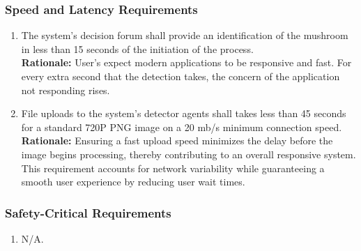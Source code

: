 \documentclass[]{article}
\begin{document}
\subsubsection{Speed and Latency Requirements}
\label{ssub:speed_and_latency_requirements}
\begin{enumerate}[{PR-SL}1. ]
	\item The system's decision forum shall provide an identification of the mushroom in less than 15 seconds of the initiation of the process.\\
	\textbf{Rationale:} User's expect modern applications to be responsive and fast. For every extra second that the detection takes, the concern of the application 
	not responding rises.
	\item File uploads to the system's detector agents shall takes less than 45 seconds for a standard 720P PNG image on a 20 mb/s minimum connection speed.\\
	\textbf{Rationale:} Ensuring a fast upload speed minimizes the delay before the image begins processing, thereby contributing to an overall responsive system. This requirement accounts for network variability while guaranteeing a smooth user experience by reducing user wait times.

\end{enumerate}

\subsubsection{Safety-Critical Requirements}
\label{ssub:safety_critical_requirements}
\begin{enumerate}[{PR-SC}1. ]
	\item N/A.
\end{enumerate}
\end{document}
